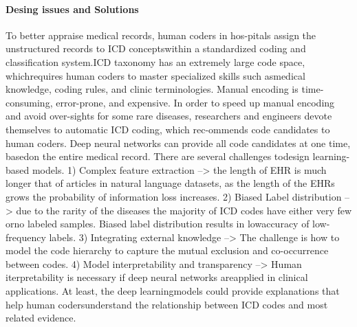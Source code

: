 \paragraph{Desing issues and Solutions}
To  better  appraise  medical  records,  human  coders  in  hos-pitals  assign  the  unstructured  records   to  ICD  conceptswithin  a  standardized  coding  and  classification  system.ICD  taxonomy  has  an  extremely  large  code  space,  whichrequires human coders to master specialized skills such asmedical knowledge, coding rules, and clinic terminologies. Manual encoding is time-consuming, error-prone, and expensive.
In order to speed up manual encoding and avoid over-sights  for  some  rare  diseases,  researchers  and  engineers devote  themselves  to  automatic  ICD  coding,  which  rec-ommends  code  candidates  to  human  coders.  Deep  neural networks can provide all code candidates at one time, basedon the entire medical record. There are several challenges todesign learning-based models.
	1) Complex feature extraction --> the length of EHR is much longer that of articles in natural language datasets, as the length of the EHRs grows the probability of information loss increases. 
	2) Biased Label distribution --> due to the rarity of the diseases the majority of ICD codes have 
	either very few orno labeled samples. Biased label distribution results in lowaccuracy  of  low-frequency  labels.
	3) Integrating external knowledge --> The challenge is how to model the code hierarchy to capture the mutual exclusion and co-occurrence between codes.
	4) Model interpretability and transparency --> Human iterpretability  is  necessary  if  deep  neural  networks  areapplied in clinical applications. At least, the deep learningmodels could provide explanations that help human codersunderstand  the  relationship  between  ICD  codes  and  most related evidence.
	
